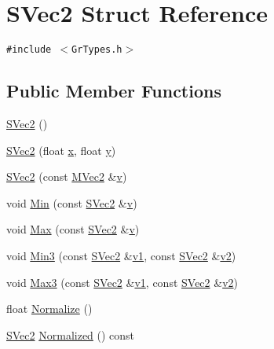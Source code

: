 \hypertarget{struct_s_vec2}{
\section{SVec2 Struct Reference}
\label{struct_s_vec2}
}
{\tt \#include $<$GrTypes.h$>$}

\subsection*{Public Member Functions}
\begin{CompactItemize}
\item 
\hyperlink{struct_s_vec2_684d52bddcb852a9c3af59441d3a9f5a}{SVec2} ()
\item 
\hyperlink{struct_s_vec2_8e24b6d71d48cd646848f64d0e667c60}{SVec2} (float \hyperlink{struct_s_vec2_328ec1b6dafebcc1eb6bf84f790f39b7}{x}, float \hyperlink{struct_s_vec2_47cf4560950d17311222a547a98c4fde}{y})
\item 
\hyperlink{struct_s_vec2_abeefa09246898126cdfa47fc7110e49}{SVec2} (const \hyperlink{class_m_vec2}{MVec2} \&\hyperlink{glext__bak_8h_5cf89b94f7478c0ebc4429b60e7ef93b}{v})
\item 
void \hyperlink{struct_s_vec2_fe64c54a3bd10fe8cfcb45d16ea1aa4f}{Min} (const \hyperlink{struct_s_vec2}{SVec2} \&\hyperlink{glext__bak_8h_5cf89b94f7478c0ebc4429b60e7ef93b}{v})
\item 
void \hyperlink{struct_s_vec2_32809c8ccf4e0a0c349c584943f5ee04}{Max} (const \hyperlink{struct_s_vec2}{SVec2} \&\hyperlink{glext__bak_8h_5cf89b94f7478c0ebc4429b60e7ef93b}{v})
\item 
void \hyperlink{struct_s_vec2_587ea700a22c39a87fb928b78bb43959}{Min3} (const \hyperlink{struct_s_vec2}{SVec2} \&\hyperlink{glext__bak_8h_435c176a02c061b43e19bdf7c86cceae}{v1}, const \hyperlink{struct_s_vec2}{SVec2} \&\hyperlink{glext__bak_8h_0928f6d0f0f794ba000a21dfae422136}{v2})
\item 
void \hyperlink{struct_s_vec2_fc34a31b79ddcf44936040b6fd6f360a}{Max3} (const \hyperlink{struct_s_vec2}{SVec2} \&\hyperlink{glext__bak_8h_435c176a02c061b43e19bdf7c86cceae}{v1}, const \hyperlink{struct_s_vec2}{SVec2} \&\hyperlink{glext__bak_8h_0928f6d0f0f794ba000a21dfae422136}{v2})
\item 
float \hyperlink{struct_s_vec2_3dcd2a390aa3ad0520f6721f104fc029}{Normalize} ()
\item 
\hyperlink{struct_s_vec2}{SVec2} \hyperlink{struct_s_vec2_f9d4f2ade78ce5c42ebeb52e92bf7547}{Normalized} () const 
\item 

\end{CompactItemize}
